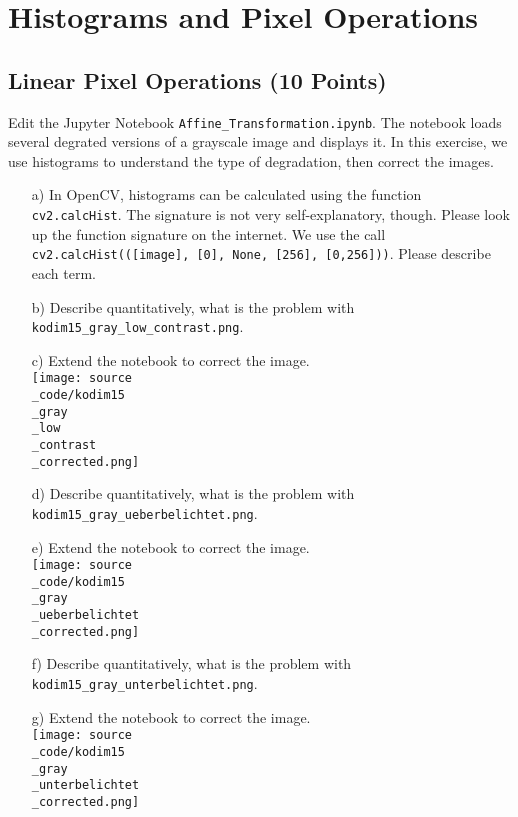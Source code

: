 \def\firstname{firstname}
\def\lastname{lastname}
\def\aufgabenblatt{2}




\thispagestyle{page1} 

\section{Histograms and Pixel Operations}

\subsection{Linear Pixel Operations (10 Points)}

Edit the Jupyter Notebook \texttt{Affine\_Transformation.ipynb}. The notebook loads several degrated versions of a grayscale image and displays it.
In this exercise, we use histograms to understand the type of degradation, then correct the images.

\begin{enumerate}
\item[a)] In OpenCV, histograms can be calculated using the function \texttt{cv2.calcHist}. The signature is not very self-explanatory, though. Please look up
the function signature on the internet. We use the call \texttt{cv2.calcHist(([image], [0], None, [256], [0,256]))}. Please describe each term.
\item[b)] Describe quantitatively, what is the problem with \texttt{kodim15\_gray\_low\_contrast.png}. 
\item[c)] Extend the notebook to correct the image. \\
\texttt{[image: source\\\_code/kodim15\\\_gray\\\_low\\\_contrast\\\_corrected.png]}

\item[d)] Describe quantitatively, what is the problem with \texttt{kodim15\_gray\_ueberbelichtet.png}. 
\item[e)] Extend the notebook to correct the image. \\
\texttt{[image: source\\\_code/kodim15\\\_gray\\\_ueberbelichtet\\\_corrected.png]}

\item[f)] Describe quantitatively, what is the problem with \texttt{kodim15\_gray\_unterbelichtet.png}. 
\item[g)] Extend the notebook to correct the image. \\
\texttt{[image: source\\\_code/kodim15\\\_gray\\\_unterbelichtet\\\_corrected.png]}
\end{enumerate}

